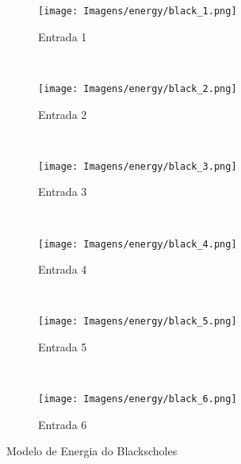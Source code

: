 \begin{figure}[H]
    \centering
    \begin{subfigure}[t]{0.5\textwidth}
        \centering
        \texttt{[image: Imagens/energy/black\_1.png]}
        \caption{Entrada 1}
    \end{subfigure}%
    ~ 
    \begin{subfigure}[t]{0.5\textwidth}
        \centering
        \texttt{[image: Imagens/energy/black\_2.png]}
        \caption{Entrada 2}
    \end{subfigure}
    \\
    \centering
    \begin{subfigure}[t]{0.5\textwidth}
        \centering
        \texttt{[image: Imagens/energy/black\_3.png]}
        \caption{Entrada 3}
    \end{subfigure}%
    ~ 
    \begin{subfigure}[t]{0.5\textwidth}
        \centering
        \texttt{[image: Imagens/energy/black\_4.png]}
        \caption{Entrada 4}
    \end{subfigure}
    \\
    \centering
    \begin{subfigure}[t]{0.5\textwidth}
        \centering
        \texttt{[image: Imagens/energy/black\_5.png]}
        \caption{Entrada 5}
    \end{subfigure}%
    ~ 
    \begin{subfigure}[t]{0.5\textwidth}
        \centering
        \texttt{[image: Imagens/energy/black\_6.png]}
        \caption{Entrada 6}
    \end{subfigure}
	\caption{Modelo de Energia do Blackscholes}
	\label{fig:energia_black}
\end{figure}

